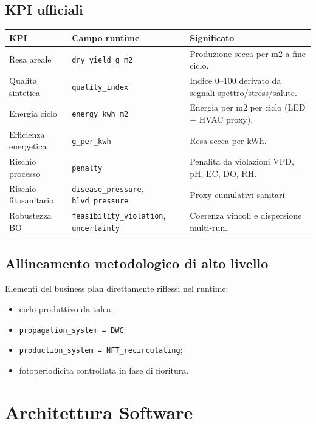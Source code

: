 ﻿\documentclass[11pt,a4paper]{report}
\begin{document}
\section{KPI ufficiali}
\begin{longtable}{@{}p{4.0cm}p{4.0cm}p{5.8cm}@{}}
\toprule
KPI & Campo runtime & Significato \\ \midrule
Resa areale & \texttt{dry\_yield\_g\_m2} & Produzione secca per m2 a fine ciclo. \\
Qualita sintetica & \texttt{quality\_index} & Indice 0--100 derivato da segnali spettro/stress/salute. \\
Energia ciclo & \texttt{energy\_kwh\_m2} & Energia per m2 per ciclo (LED + HVAC proxy). \\
Efficienza energetica & \texttt{g\_per\_kwh} & Resa secca per kWh. \\
Rischio processo & \texttt{penalty} & Penalita da violazioni VPD, pH, EC, DO, RH. \\
Rischio fitosanitario & \texttt{disease\_pressure}, \texttt{hlvd\_pressure} & Proxy cumulativi sanitari. \\
Robustezza BO & \texttt{feasibility\_violation}, \texttt{uncertainty} & Coerenza vincoli e dispersione multi-run. \\
\bottomrule
\end{longtable}

\section{Allineamento metodologico di alto livello}
Elementi del business plan direttamente riflessi nel runtime:
\begin{itemize}
  \item ciclo produttivo da talea;
  \item \texttt{propagation\_system = DWC};
  \item \texttt{production\_system = NFT\_recirculating};
  \item fotoperiodicita controllata in fase di fioritura.
\end{itemize}

\newpage
\chapter{Architettura Software}
\end{document}

